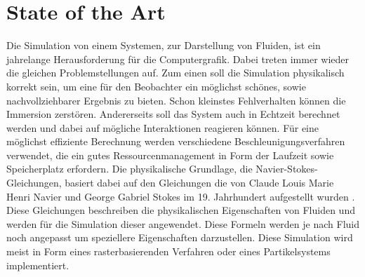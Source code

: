 \documentclass[intern,palatino]{cgBA}
\begin{document}
\section{State of the Art}
Die Simulation von einem Systemen, zur Darstellung von Fluiden, ist ein jahrelange Herausforderung für die Computergrafik. Dabei treten immer wieder die gleichen Problemstellungen auf. Zum einen soll die Simulation physikalisch korrekt sein, um eine für den Beobachter ein möglichst schönes, sowie nachvollziehbarer Ergebnis zu bieten. Schon kleinstes Fehlverhalten können die Immersion zerstören. Andererseits soll das System auch in Echtzeit berechnet werden und dabei auf mögliche Interaktionen reagieren können. Für eine möglichst effiziente Berechnung werden verschiedene Beschleunigungsverfahren verwendet, die ein gutes Ressourcenmanagement in Form der Laufzeit sowie Speicherplatz erfordern.
\newline \newline
Die physikalische Grundlage, die Navier-Stokes-Gleichungen, basiert dabei auf den Gleichungen die von Claude Louis Marie Henri Navier und George Gabriel Stokes im 19. Jahrhundert aufgestellt wurden \cite{wiki:xxx}. Diese Gleichungen beschreiben die physikalischen Eigenschaften von Fluiden und werden für die Simulation dieser angewendet. Diese Formeln werden je nach Fluid noch angepasst um speziellere Eigenschaften darzustellen.
\newline
Diese Simulation wird meist in Form eines rasterbasierenden Verfahren oder eines Partikelsystems implementiert.\newline

\end{document}

